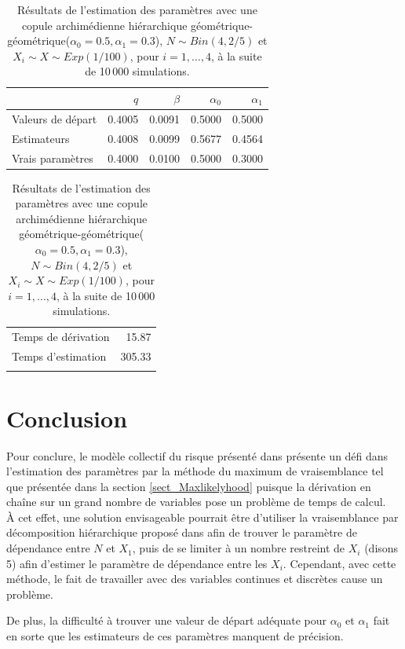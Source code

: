 \documentclass{article}
\begin{document}
		\begin{table}[H]
			\centering
			\begin{tabular}{lrrrr}
				\hline
				& $q$ & $\beta$ & $\alpha_0$ & $\alpha_1$ \\ 
				\hline
				Valeurs de départ & 0.4005 & 0.0091 & 0.5000 & 0.5000 \\ 
				Estimateurs & 0.4008 & 0.0099 & 0.5677 & 0.4564 \\ 
				Vrais paramètres & 0.4000 & 0.0100 & 0.5000 & 0.3000 \\ 
				\hline
			\end{tabular}
			\begin{tabular}{lr}
				\hline
				&  \\ 
				\hline
				Temps de dérivation & 15.87 \\ 
				Temps d'estimation & 305.33 \\ 
				\\
				\hline
			\end{tabular}
			\caption[Résultats du scénario \ref{scenario_geo_geo}]{Résultats de l'estimation des paramètres avec une copule archimédienne hiérarchique géométrique-géométrique($\alpha_0=0.5, \alpha_1=0.3$), $N \sim Bin(4, 2/5)$ et $X_i \sim X \sim Exp(1/100)$, pour $i=1,\dots,4$, à la suite de 10\,000 simulations.}
			\label{tbl_resultats_geo_geo}
		\end{table}
	
	
		
	\section{Conclusion}
		Pour conclure, le modèle collectif du risque présenté dans \cite{Itre5} présente un défi dans l'estimation des paramètres par la méthode du maximum de vraisemblance tel que présentée dans la section \ref{sect_Maxlikelyhood} puisque la dérivation en chaîne sur un grand nombre de variables pose un problème de temps de calcul.\\
		
		À cet effet, une solution envisageable pourrait être d'utiliser la vraisemblance par décomposition hiérarchique proposé dans \cite{LikelyhoodEstimation} afin de trouver le paramètre de dépendance entre $N$ et $X_1$, puis de se limiter à un nombre restreint de $X_i$ (disons 5) afin d'estimer le paramètre de dépendance entre les $X_i$. Cependant, avec cette méthode, le fait de travailler avec des variables continues et discrètes cause un problème.
		
		De plus, la difficulté à trouver une valeur de départ adéquate pour $\alpha_{0}$ et $\alpha_{1}$ fait en sorte que les estimateurs de ces paramètres manquent de précision.
	 
		
	\clearpage
	
	
\end{document}
